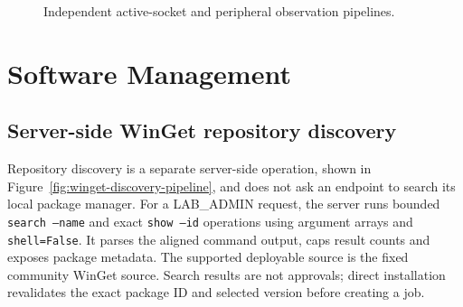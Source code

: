 \documentclass[12pt,a4paper]{report}
\begin{document}
\begin{figure}[H]
\centering
{}
\caption{Independent active-socket and peripheral observation pipelines.}
\label{fig:peripheral-pipeline}
\end{figure}

\section{Software Management}

\subsection{Server-side WinGet repository discovery}
Repository discovery is a separate server-side operation, shown in
Figure~\ref{fig:winget-discovery-pipeline}, and does not ask an
endpoint to search its local package manager. For a LAB\_ADMIN request, the
server runs bounded \texttt{search --name} and exact \texttt{show --id}
operations using argument arrays and \texttt{shell=False}. It parses the
aligned command output, caps result counts and exposes package metadata. The
supported deployable source is the fixed community WinGet source. Search
results are not approvals; direct installation revalidates the exact package
ID and selected version before creating a job.
\end{document}
